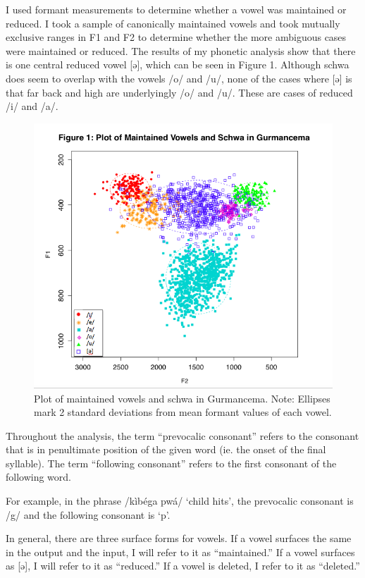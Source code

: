 \documentclass[output=paper,newtxmath,modfonts,nonflat,draftmode]{langsci/langscibook}
\begin{document}
I used formant measurements to determine whether a vowel was maintained or reduced. I took a sample of canonically maintained vowels and took mutually exclusive ranges in F1 and F2 to determine whether the more ambiguous cases were maintained or reduced. The results of my phonetic analysis show that there is one central reduced vowel [ə], which can be seen in Figure 1. Although schwa does seem to overlap with the vowels /o/ and /u/, none of the cases where [ə] is that far back and high are underlyingly /o/ and /u/. These are cases of reduced /i/ and /a/.



\begin{figure} 
\includegraphics[width=\linewidth]{figures/ACAL_Vowel_plot.png}
\caption{Plot of maintained vowels and schwa in Gurmancema. Note: Ellipses mark 2 standard deviations from mean formant values of each vowel.}
  \end{figure}
 

Throughout the analysis, the term “prevocalic consonant” refers to the consonant that is in penultimate position of the given word (ie. the onset of the final syllable). The term “following consonant” refers to the first consonant of the following word. 

For example, in the phrase /kìbéga pwá/ `child hits', the prevocalic consonant is /g/ and the following consonant is `p'. 

In general, there are three surface forms for vowels. If a vowel surfaces the same in the output and the input, I will refer to it as “maintained.” If a vowel surfaces as [ə], I will refer to it as “reduced.” If a vowel is deleted, I refer to it as “deleted.”
\end{document}
